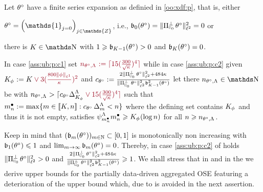 \bigskip

\begin{as}\label{ass:ub:p}
Let $\fxdf$ have a finite series expansion as definied in \ref{oo:xdf:p}, that is, either
\begin{inparaenum}[i]\renewcommand{\theenumi}{\dgrau\rm(\alph{enumi})}
\item\label{ass:ub:p:c1}
	$\fxdf=\left(\mathds{1}_{j = 0}\right)_{j \in \mathds{Z}}$, i.e., $\bias[0](\fxdf)=\Vnormlp{\Proj[{\mHiH[0]}]^\perp\fxdf}^2=0$ or
\item\label{ass:ub:p:c2}
	there is $K\in\N$ with $1\geq \bias[{K-1}](\fxdf)>0$ and $\bias[K](\fxdf)=0$.
\end{inparaenum}
In case  \ref{ass:ub:p:c1} set $\dr\ssY_{\fxdf,\iSv}:=\ceil{15(\tfrac{300}{\sqrt{\cpen}})^4}$ while in case \ref{ass:ub:p:c2} given $K_{\fydf}:=K\dr\vee 3(\tfrac{800\Vnormlp[1]{\fydf}}{\cpen})^2$ and $c_{\fxdf}:=\tfrac{2\Vnormlp{\Proj[{\mHiH[0]}]^\perp\fxdf}^2+484\cpen}{\Vnormlp{\Proj[{\mHiH[0]}]^\perp\fxdf}^2\bias[{K-1}]^2(\fxdf)}$ let there $\ssY_{\fxdf,\iSv}\in\N$ be with $\ssY_{\fxdf,\iSv}>\ceil{c_{\fxdf}\DipenSv[K_{\fydf}]\dr\vee15(\tfrac{300}{\sqrt{\cpen}})^4}$ such that $\sDi{\ssY}:=\max\{\Di\in\nset{K,\ssY}:c_{\fxdf}\,\DipenSv<\ssY\}$ where the defining set contains $K_{\fydf}$ and thus it is not empty, satisfies $\cmiSv[\sDi{\ssY}]\sDi{\ssY}\geq K_{\fydf}(\log\ssY)$ for all $\ssY\geq \ssY_{\fxdf,\iSv}$.
\end{as}
\begin{rmk}\label{rem:ass:ub:p}
 Keep in mind that $\Nsuite[\Di]{\bias(\fxdf)}\subset[0,1]$ is monotonically non increasing with $\bias[1](\fxdf)\leq1$ and $\lim_{\Di\to\infty}\bias(\fxdf)=0$.
Thereby, in case \ref{ass:ub:p:c2} of  holds $\Vnormlp{\Proj[{\mHiH[0]}]^\perp\fxdf}^2>0$ and $\tfrac{2\Vnormlp{\Proj[{\mHiH[0]}]^\perp\fxdf}^2+484\cpen}{\Vnormlp{\Proj[{\mHiH[0]}]^\perp\fxdf}^2\bias[{K-1}]^2(\fxdf)}\geq1$.
We shall stress that in  and  in the  we derive upper bounds for the partially data-driven aggregated OSE featuring a deterioration of the upper bound which, due to  is avoided in the next assertion.
\end{rmk}
